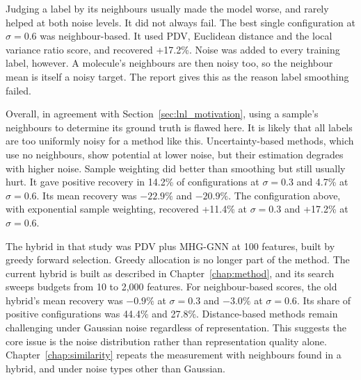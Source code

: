 Judging a label by its neighbours usually made the model worse, and rarely helped at both noise levels. It did not always fail. The best single configuration at $\sigma = 0.6$ was neighbour-based. It used PDV, Euclidean distance and the local variance ratio score, and recovered +17.2\%. Noise was added to every training label, however. A molecule's neighbours are then noisy too, so the neighbour mean is itself a noisy target. The report gives this as the reason label smoothing failed.

Overall, in agreement with Section~\ref{sec:lnl_motivation}, using a sample's neighbours to determine its ground truth is flawed here. It is likely that all labels are too uniformly noisy for a method like this. Uncertainty-based methods, which use no neighbours, show potential at lower noise, but their estimation degrades with higher noise. Sample weighting did better than smoothing but still usually hurt. It gave positive recovery in 14.2\% of configurations at $\sigma = 0.3$ and 4.7\% at $\sigma = 0.6$. Its mean recovery was $-22.9\%$ and $-20.9\%$. The configuration above, with exponential sample weighting, recovered +11.4\% at $\sigma = 0.3$ and +17.2\% at $\sigma = 0.6$.

The hybrid in that study was PDV plus MHG-GNN at 100 features, built by greedy forward selection. Greedy allocation is no longer part of the method. The current hybrid is built as described in Chapter~\ref{chap:method}, and its search sweeps budgets from 10 to 2,000 features. For neighbour-based scores, the old hybrid's mean recovery was $-0.9\%$ at $\sigma = 0.3$ and $-3.0\%$ at $\sigma = 0.6$. Its share of positive configurations was 44.4\% and 27.8\%. Distance-based methods remain challenging under Gaussian noise regardless of representation. This suggests the core issue is the noise distribution rather than representation quality alone. Chapter~\ref{chap:similarity} repeats the measurement with neighbours found in a hybrid, and under noise types other than Gaussian.
